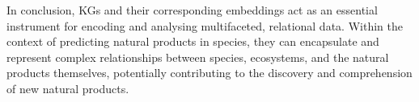 \documentclass[
11pt, %
oneside, %
english, %
singlespacing, %
headsepline, %
chapterinoneline, %
]{MastersDoctoralThesis} %
\begin{document}
In conclusion, KGs and their corresponding embeddings act as an essential instrument for encoding and analysing multifaceted, relational data. Within the context of predicting natural products in species, they can encapsulate and represent complex relationships between species, ecosystems, and the natural products themselves, potentially contributing to the discovery and comprehension of new natural products.


\appendix %


%
%
%

\renewcommand{\bibname}{References}




\end{document}
